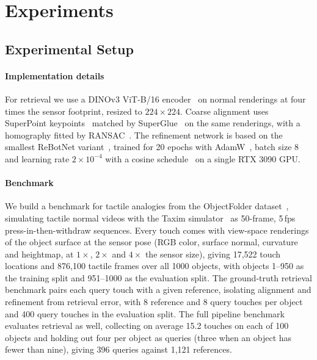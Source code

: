 \section{Experiments}
\label{sec:exp}

\subsection{Experimental Setup}

\paragraph{Implementation details}
For retrieval we use a DINOv3 ViT-B/16 encoder~\cite{dinov3} on normal renderings at four times the
sensor footprint, resized to $224\times224$. Coarse alignment uses SuperPoint
keypoints~\cite{superpoint} matched by SuperGlue~\cite{superglue} on the same renderings, with a
homography fitted by RANSAC~\cite{ransac}. The refinement network is based on the smallest ReBotNet
variant~\cite{rebotnet}, trained for 20 epochs with AdamW~\cite{adamw}, batch size 8 and learning
rate $2\times10^{-4}$ with a cosine schedule~\cite{cosine_schedule} on a single RTX 3090 GPU.

\paragraph{Benchmark}
We build a benchmark for tactile analogies from the ObjectFolder dataset~\cite{objectfolder},
simulating tactile normal videos with the Taxim simulator~\cite{taxim} as 50-frame, 5\,fps
press-in-then-withdraw sequences. Every touch comes with view-space renderings of the object
surface at the sensor pose (RGB color, surface normal, curvature and heightmap, at $1\times$,
$2\times$ and $4\times$ the sensor size), giving 17{,}522 touch locations and 876{,}100 tactile
frames over all 1000 objects, with objects 1--950 as the training split and 951--1000 as the
evaluation split. The ground-truth retrieval benchmark pairs each query touch with a given
reference, isolating alignment and refinement from retrieval error, with 8 reference and 8 query
touches per object and 400 query touches in the evaluation split. The full pipeline benchmark
evaluates retrieval as well, collecting on average 15.2 touches on each of 100 objects and holding
out four per object as queries (three when an object has fewer than nine), giving 396 queries
against 1{,}121 references.

